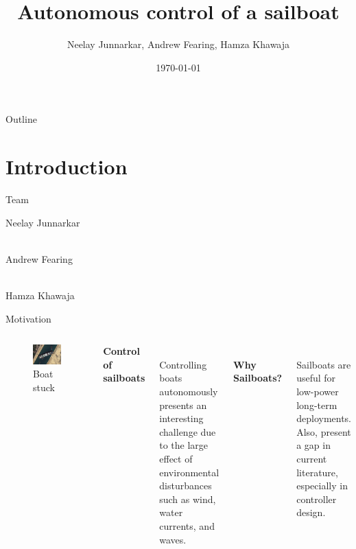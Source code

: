 \documentclass[10pt,xcolor={table,dvipsnames},t]{beamer}
\title[Autosailboat]{Autonomous control of a sailboat}
\author{Neelay Junnarkar, Andrew Fearing, Hamza Khawaja}
\date{\today}
\begin{document}
\begin{frame}
  \titlepage
\end{frame}

\begin{frame}{Outline}
 \tableofcontents
\end{frame}
\section{Introduction}
\begin{frame}{Team}

Neelay Junnarkar

\hfill\\
Andrew Fearing

\hfill\\
Hamza Khawaja
\end{frame}


\begin{frame}{Motivation}
\begin{columns}
    \begin{figure}
        \centering
        \includegraphics{documents/figures/Suez_Canal_blocked_by_Ever_Given_March_27_2021.jpg}
        \caption{Boat stuck}
        \label{fig:boat_stuck}
    \end{figure}  
    \textbf{Control of sailboats}
    
    \hfill\\
    Controlling boats autonomously presents an interesting challenge due to the large effect of environmental disturbances such as wind, water currents, and waves. 
    
    \hfill\\
    \textbf{Why Sailboats?}
    
    \hfill\\
    Sailboats are useful for low-power long-term deployments. Also, present a gap in current literature,
    especially in controller design.
    
\end{columns}
\end{frame}
\end{document}
